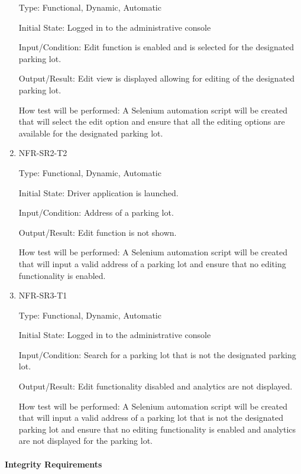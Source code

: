 \documentclass[12pt, titlepage]{article}
\begin{document}
\begin{enumerate}
Type: Functional, Dynamic, Automatic
					
Initial State: Logged in to the administrative console 
					
Input/Condition: Edit function is enabled and is selected for the designated
parking lot.
					
Output/Result: Edit view is displayed allowing for editing of the designated
parking lot.
					
How test will be performed: A Selenium automation script will be created that
will select the edit option and ensure that all the editing options are
available for the designated parking lot.

\item{NFR-SR2-T2}

Type: Functional, Dynamic, Automatic
					
Initial State: Driver application is launched.
					
Input/Condition: Address of a parking lot.
					
Output/Result: Edit function is not shown.
					
How test will be performed: A Selenium automation script will be created that
will input a valid address of a parking lot and ensure that no editing
functionality is enabled.

\item{NFR-SR3-T1}

Type: Functional, Dynamic, Automatic
					
Initial State: Logged in to the administrative console 
					
Input/Condition: Search for a parking lot that is not the designated parking
lot.
					
Output/Result: Edit functionality disabled and analytics are not displayed.

How test will be performed: A Selenium automation script will be created that
will input a valid address of a parking lot that is not the designated parking
lot and ensure that no editing functionality is enabled and analytics are not
displayed for the parking lot.

\end{enumerate}

\paragraph{Integrity Requirements}
\end{document}
